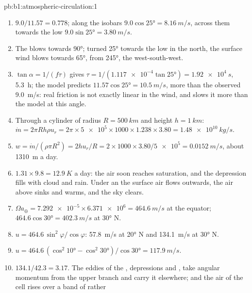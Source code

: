 \begin{solution}{pb:b1:atmospheric-circulation:1}
\begin{enumerate}
        the balance has no time to set in, and the formula does not apply.
  \item $9.0/11.57 = 0.778$; along the isobars $9.0\cos\ang{25} = \qty{8.16}{m/s}$,
        across them towards the low $9.0\sin\ang{25} = \qty{3.80}{m/s}$.
  \item The  blows towards  \ang{90}; turned \ang{25} towards
        the low in the north, the surface wind blows towards \ang{65}, from
        \ang{245}, the west-south-west.
  \item $\tan\alpha = 1/(f\tau)$ gives $\tau = 1/(\num{1.117e-4}\tan\ang{25}) =
        \qty{1.92e4}{s}$, \qty{5.3}{h}; the model predicts $11.57\cos\ang{25} =
        \qty{10.5}{m/s}$, more than the observed \qty{9.0}{m/s}: real friction
        is not exactly linear in the wind, and slows it more than the model at this
        angle.
  \item Through a cylinder of radius $R = \qty{500}{km}$ and height $h =
        \qty{1}{km}$: $\dot m = 2\pi R h\rho u_r = 2\pi \times \num{5e5} \times 1000
        \times 1.238 \times 3.80 = \qty{1.48e10}{kg/s}$.
  \item $w = \dot m/(\rho\pi R^2) = 2hu_r/R = 2 \times 1000 \times 3.80/\num{5e5} =
        \qty{0.0152}{m/s}$, about \qty{1310}{m} a day.
  \item $1.31 \times 9.8 = \qty{12.9}{K}$ a day: the air soon reaches saturation,
        and the depression fills with cloud and rain. Under an  the
        surface air flows outwards, the air above sinks and warms, and the sky
        clears.
  \item $\Omega a_\oplus = \num{7.292e-5} \times \num{6.371e6} = \qty{464.6}{m/s}$
        at the equator; $464.6\cos\ang{30} = \qty{402.3}{m/s}$ at \ang{30} N.
  \item $u = 464.6\,\sin^2\varphi/\cos\varphi$: \qty{57.8}{m/s} at \ang{20} N and
        \qty{134.1}{m/s} at \ang{30} N.
  \item $u = 464.6\,(\cos^2\ang{10} - \cos^2\ang{30})/\cos\ang{30} =
        \qty{117.9}{m/s}$.
  \item $134.1/42.3 = 3.17$. The eddies of the , depressions and
        , take angular momentum from the upper branch and carry it
        elsewhere; and the air of the cell rises over a band of  rather

\end{enumerate}
\end{solution}
